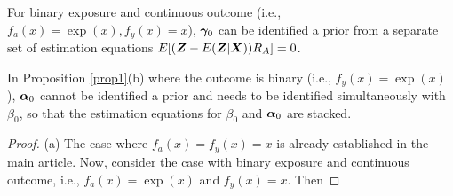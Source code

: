 \documentclass[12pt]{article}
\begin{document}
{For binary exposure and continuous outcome (i.e., $ f_a(x)= \exp(x), f_y(x)=x $),   $\bm \gamma_0 $ can be identified a prior from a separate set of estimation equations $ E[ (\bm{Z}-E(\bm{Z}|\bm{X}))R_A ] =0$.  


In Proposition \ref{prop1}(b) where the outcome is binary (i.e., $ f_y(x)=\exp(x) $), $\bm \alpha_0$ cannot be identified a prior and needs to be identified simultaneously with $\beta_0$, so that  the estimation equations for $ \beta_0 $ and $ \bm \alpha_0 $ are stacked. 

\begin{proof}
(a) The case where $ f_a(x)= f_y(x)= x $ is already established in the main article.  Now, consider the case with binary exposure and continuous outcome, i.e., $ f_a(x)=\exp(x) $ and $ f_y(x)= x $. Then

\end{proof}}
\end{document}
